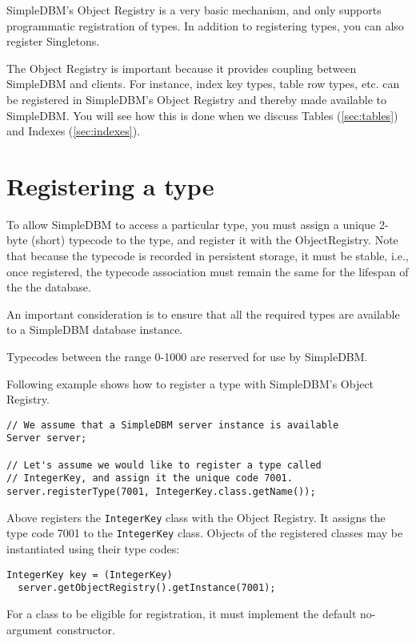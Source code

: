 \documentclass[a4paper,draft,oneside]{book}
\begin{document}
SimpleDBM's Object Registry is a very basic mechanism, and only
supports programmatic registration of types. In addition to
registering types, you can also register Singletons.

The Object Registry is important because it provides
coupling between SimpleDBM and clients. For instance, index key
types, table row types, etc. can be registered in SimpleDBM's
Object Registry and thereby made available to SimpleDBM. You will
see how this is done when we discuss Tables (\ref{sec:tables}) and 
Indexes (\ref{sec:indexes}).

\section{Registering a type}
To allow SimpleDBM to access a particular type, you must assign a
unique 2-byte (short) typecode to the type, and register it with the
ObjectRegistry. Note that because the typecode is recorded in
persistent storage, it must be stable, i.e., once registered, the
typecode association must remain the same for the lifespan of the
the database. 

An important consideration is to ensure that all the required types
are available to a SimpleDBM database instance. 

Typecodes between the range 0-1000 are reserved for use by
SimpleDBM.

Following example shows how to register a type with SimpleDBM's Object
Registry.

\begin{verbatim}
// We assume that a SimpleDBM server instance is available
Server server;		

// Let's assume we would like to register a type called
// IntegerKey, and assign it the unique code 7001. 
server.registerType(7001, IntegerKey.class.getName());
\end{verbatim}

Above registers the \verb|IntegerKey| class with the Object Registry. It
assigns the type code 7001 to the \verb|IntegerKey| class. Objects of the
registered classes may be instantiated using their type codes:

\begin{verbatim}
IntegerKey key = (IntegerKey) 
  server.getObjectRegistry().getInstance(7001);
\end{verbatim}

For a class to be eligible for registration, it must implement the
default no-argument constructor.
\end{document}
